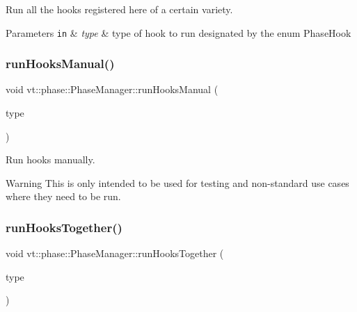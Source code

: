 Run all the hooks registered here of a certain variety. 


\begin{DoxyParams}[1]{Parameters}
\mbox{\tt in}  & {\em type} & type of hook to run designated by the enum {\ttfamily Phase\+Hook} \\
\hline
\end{DoxyParams}
\mbox{\label{structvt_1_1phase_1_1_phase_manager_ae436f95e5eb570b17c71a48d96675f69}} 
\subsubsection{\texorpdfstring{run\+Hooks\+Manual()}{runHooksManual()}}
{\footnotesize\ttfamily void vt\+::phase\+::\+Phase\+Manager\+::run\+Hooks\+Manual (\begin{DoxyParamCaption}\item[{\hyperlink{namespacevt_1_1phase_aec9a63fdd99680d7a7fe99d321193811}{Phase\+Hook}}]{type }\end{DoxyParamCaption})}



Run hooks manually. 

\begin{DoxyWarning}{Warning}
This is only intended to be used for testing and non-\/standard use cases where they need to be run. 
\end{DoxyWarning}
\mbox{\label{structvt_1_1phase_1_1_phase_manager_aa61710b25b47f56713d3eec68e7ce6f6}} 
\subsubsection{\texorpdfstring{run\+Hooks\+Together()}{runHooksTogether()}}
{\footnotesize\ttfamily void vt\+::phase\+::\+Phase\+Manager\+::run\+Hooks\+Together (\begin{DoxyParamCaption}\item[{\hyperlink{namespacevt_1_1phase_aec9a63fdd99680d7a7fe99d321193811}{Phase\+Hook}}]{type }\end{DoxyParamCaption})\hspace{0.3cm}{\ttfamily [private]}}




